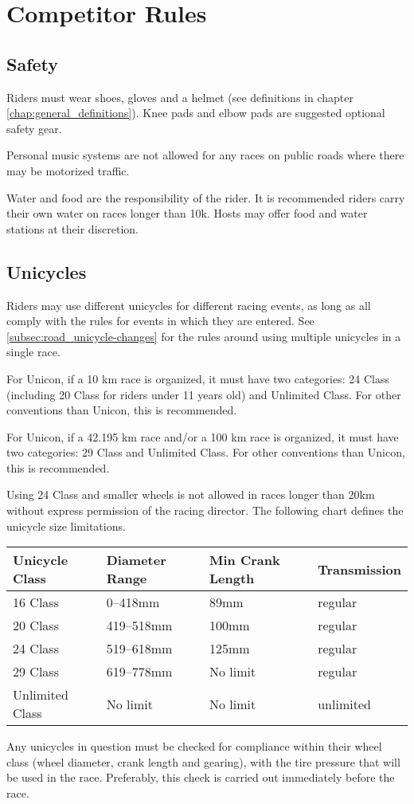 \chapter{Competitor Rules}

\section{Safety}
Riders must wear shoes, gloves and a helmet (see definitions in chapter \ref{chap:general_definitions}).
Knee pads and elbow pads are suggested optional safety gear.

Personal music systems are not allowed for any races on public roads where there may be motorized traffic.

Water and food are the responsibility of the rider.
It is recommended riders carry their own water on races longer than 10k.
Hosts may offer food and water stations at their discretion.

\section{Unicycles}

Riders may use different unicycles for different racing events, as long as all comply with the rules for events in which they are entered.
See \ref{subsec:road_unicycle-changes} for the rules around using multiple unicycles in a single race.

For Unicon, if a 10 km race is organized, it must have two categories: 24 Class (including 20 Class for riders under 11 years old) and Unlimited Class.
For other conventions than Unicon, this is recommended.

For Unicon, if a 42.195 km race and/or a 100 km race is organized, it must have two categories: 29 Class and Unlimited Class.
For other conventions than Unicon, this is recommended.

Using 24 Class and smaller wheels is not allowed in races longer than 20km without express permission of the racing director.
The following chart defines the unicycle size limitations.

\begin{longtable}{|p{3cm}|p{3.5cm}|p{4cm}|p{3cm}|}
\hline
\textbf{Unicycle Class} & \textbf{Diameter Range} & \textbf{Min Crank Length} & \textbf{Transmission}\\
\hline
16 Class & 0--418mm & 89mm & regular \\
\hline
20 Class & 419--518mm & 100mm & regular \\
\hline
24 Class & 519--618mm & 125mm & regular \\
\hline
29 Class & 619--778mm & No limit & regular \\
\hline
Unlimited Class & No limit & No limit & unlimited \\
\hline
\end{longtable}
Any unicycles in question must be checked for compliance within their wheel class (wheel diameter, crank length and gearing), with the tire pressure that will be used in the race.
Preferably, this check is carried out immediately before the race.

